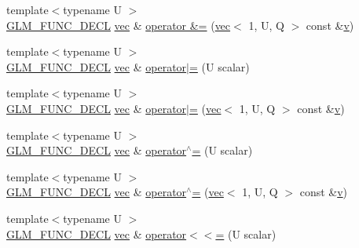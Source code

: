 \begin{DoxyCompactItemize}
\item 
{\footnotesize template$<$typename U $>$ }\\\hyperlink{setup_8hpp_ab2d052de21a70539923e9bcbf6e83a51}{G\+L\+M\+\_\+\+F\+U\+N\+C\+\_\+\+D\+E\+CL} \hyperlink{structglm_1_1vec}{vec} \& \hyperlink{structglm_1_1vec_3_011_00_01_t_00_01_q_01_4_a8c0b58226b01a0755fa54aab4ccfe274}{operator \&=} (\hyperlink{structglm_1_1vec}{vec}$<$ 1, U, Q $>$ const \&\hyperlink{_s_d_l__opengl_8h_a10a82eabcb59d2fcd74acee063775f90}{v})
\item 
{\footnotesize template$<$typename U $>$ }\\\hyperlink{setup_8hpp_ab2d052de21a70539923e9bcbf6e83a51}{G\+L\+M\+\_\+\+F\+U\+N\+C\+\_\+\+D\+E\+CL} \hyperlink{structglm_1_1vec}{vec} \& \hyperlink{structglm_1_1vec_3_011_00_01_t_00_01_q_01_4_a4461fe7917c4bf548c2cc8f0e331fa4d}{operator$\vert$=} (U scalar)
\item 
{\footnotesize template$<$typename U $>$ }\\\hyperlink{setup_8hpp_ab2d052de21a70539923e9bcbf6e83a51}{G\+L\+M\+\_\+\+F\+U\+N\+C\+\_\+\+D\+E\+CL} \hyperlink{structglm_1_1vec}{vec} \& \hyperlink{structglm_1_1vec_3_011_00_01_t_00_01_q_01_4_ab4a630f41cedd0b2e443326231a53dd3}{operator$\vert$=} (\hyperlink{structglm_1_1vec}{vec}$<$ 1, U, Q $>$ const \&\hyperlink{_s_d_l__opengl_8h_a10a82eabcb59d2fcd74acee063775f90}{v})
\item 
{\footnotesize template$<$typename U $>$ }\\\hyperlink{setup_8hpp_ab2d052de21a70539923e9bcbf6e83a51}{G\+L\+M\+\_\+\+F\+U\+N\+C\+\_\+\+D\+E\+CL} \hyperlink{structglm_1_1vec}{vec} \& \hyperlink{structglm_1_1vec_3_011_00_01_t_00_01_q_01_4_adc1d8c73a25f303593984181492ca504}{operator$^\wedge$=} (U scalar)
\item 
{\footnotesize template$<$typename U $>$ }\\\hyperlink{setup_8hpp_ab2d052de21a70539923e9bcbf6e83a51}{G\+L\+M\+\_\+\+F\+U\+N\+C\+\_\+\+D\+E\+CL} \hyperlink{structglm_1_1vec}{vec} \& \hyperlink{structglm_1_1vec_3_011_00_01_t_00_01_q_01_4_a5eb7b272edca8d8ab181dc5df3c7beb1}{operator$^\wedge$=} (\hyperlink{structglm_1_1vec}{vec}$<$ 1, U, Q $>$ const \&\hyperlink{_s_d_l__opengl_8h_a10a82eabcb59d2fcd74acee063775f90}{v})
\item 
{\footnotesize template$<$typename U $>$ }\\\hyperlink{setup_8hpp_ab2d052de21a70539923e9bcbf6e83a51}{G\+L\+M\+\_\+\+F\+U\+N\+C\+\_\+\+D\+E\+CL} \hyperlink{structglm_1_1vec}{vec} \& \hyperlink{structglm_1_1vec_3_011_00_01_t_00_01_q_01_4_a5d80ce8ed40a0461965798ddc60f8dc5}{operator$<$$<$=} (U scalar)

\end{DoxyCompactItemize}
